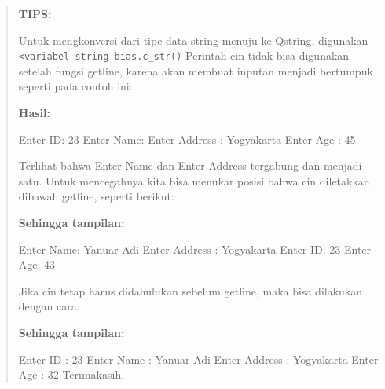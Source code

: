 \begin{quotation}

{\LARGE {}} \textbf{TIPS:}

Untuk
mengkonversi dari tipe data string menuju ke Qstring, digunakan
\texttt{\textless{}variabel\ string\ bias.c\_str()} Perintah cin tidak
bisa digunakan setelah fungsi getline, karena akan membuat inputan
menjadi bertumpuk seperti pada contoh ini:



\textbf{Hasil:}

\begin{lcverbatim}
Enter ID: 23
Enter Name: Enter Address : Yogyakarta
Enter Age : 45
\end{lcverbatim}

Terlihat bahwa Enter Name dan Enter Address tergabung dan menjadi satu.
Untuk mencegahnya kita bisa menukar posisi bahwa cin diletakkan dibawah
getline, seperti berikut:



\textbf{Sehingga tampilan:}

\begin{lcverbatim}
Enter Name: Yanuar Adi
Enter Address : Yogyakarta
Enter ID: 23
Enter Age: 43
\end{lcverbatim}

Jika cin tetap harus didahulukan sebelum getline, maka bisa dilakukan
dengan cara:



\textbf{Sehingga tampilan:}

\begin{lcverbatim}
Enter ID : 23
Enter Name : Yanuar Adi
Enter Address : Yogyakarta
Enter Age : 32
Terimakasih.
\end{lcverbatim}
\end{quotation}

